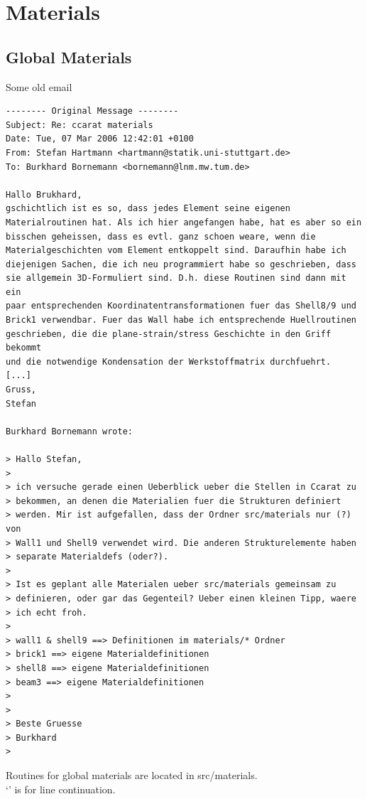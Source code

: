 



\chapter{Materials}

\section{Global Materials}

Some old email
\begin{verbatim}
-------- Original Message --------
Subject: Re: ccarat materials
Date: Tue, 07 Mar 2006 12:42:01 +0100
From: Stefan Hartmann <hartmann@statik.uni-stuttgart.de>
To: Burkhard Bornemann <bornemann@lnm.mw.tum.de>

Hallo Brukhard,
gschichtlich ist es so, dass jedes Element seine eigenen 
Materialroutinen hat. Als ich hier angefangen habe, hat es aber so ein 
bisschen geheissen, dass es evtl. ganz schoen weare, wenn die 
Materialgeschichten vom Element entkoppelt sind. Daraufhin habe ich 
diejenigen Sachen, die ich neu programmiert habe so geschrieben, dass 
sie allgemein 3D-Formuliert sind. D.h. diese Routinen sind dann mit ein 
paar entsprechenden Koordinatentransformationen fuer das Shell8/9 und 
Brick1 verwendbar. Fuer das Wall habe ich entsprechende Huellroutinen 
geschrieben, die die plane-strain/stress Geschichte in den Griff bekommt 
und die notwendige Kondensation der Werkstoffmatrix durchfuehrt.
[...]
Gruss,
Stefan

Burkhard Bornemann wrote:

> Hallo Stefan,
>
> ich versuche gerade einen Ueberblick ueber die Stellen in Ccarat zu 
> bekommen, an denen die Materialien fuer die Strukturen definiert 
> werden. Mir ist aufgefallen, dass der Ordner src/materials nur (?) von 
> Wall1 und Shell9 verwendet wird. Die anderen Strukturelemente haben 
> separate Materialdefs (oder?).
>
> Ist es geplant alle Materialen ueber src/materials gemeinsam zu 
> definieren, oder gar das Gegenteil? Ueber einen kleinen Tipp, waere 
> ich echt froh.
>
> wall1 & shell9 ==> Definitionen im materials/* Ordner
> brick1 ==> eigene Materialdefinitionen
> shell8 ==> eigene Materialdefinitionen
> beam3 ==> eigene Materialdefinitionen
>
>
> Beste Gruesse
> Burkhard
>
\end{verbatim}

Routines for global materials are located in src/materials.\\
`\cnl' is for line continuation.


